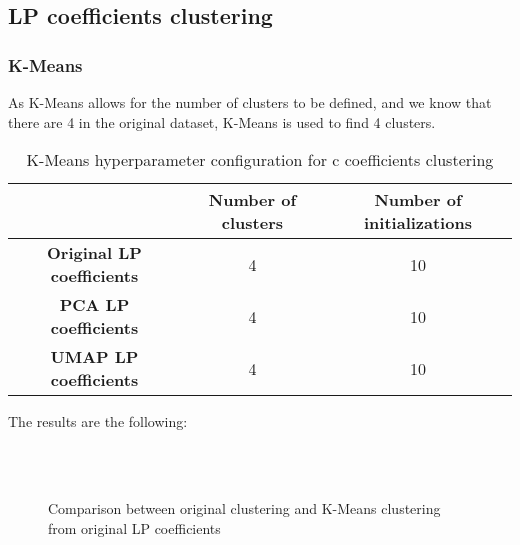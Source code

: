 	\subsection{LP coefficients clustering}

		\subsubsection{K-Means}
			
			As K-Means allows for the number of clusters to be defined, and we know that there are 4 in the original dataset, K-Means is used to find 4 clusters.
			
			\begin{table}[h!]
				\centering
				\begin{tabular}{|c|c|c|}
					\hline
					& \textbf{Number of clusters} & \textbf{Number of initializations}\\
					\hline
					\textbf{Original LP coefficients} & 4 & 10\\
					\hline
					\textbf{PCA LP coefficients} & 4 & 10\\
					\hline
					\textbf{UMAP LP coefficients} & 4 & 10\\
					\hline
				\end{tabular}
				\caption{K-Means hyperparameter configuration for c coefficients clustering}
			\end{table}
		
			The results are the following:
			
			\begin{figure*}[ht!]
				\centering
				\hspace{\fill}
				\\
				\hspace{\fill}
				\\
					
				\hspace{\fill}
				\caption{Comparison between original clustering and K-Means clustering from original LP coefficients}
			\end{figure*}
			\FloatBarrier
		
